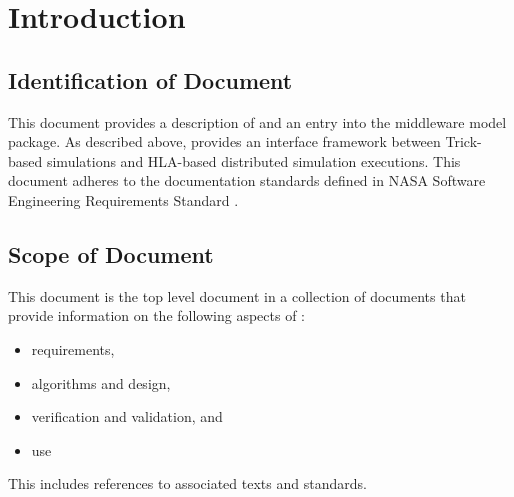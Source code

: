 \documentclass[twoside,11pt,titlepage]{report}
\begin{document}

\date{June 2020}
\modelname{\TrickHLA}
\doctype{}
\author{Edwin Z. Crues \\ and \\ Daniel E. Dexter}
\makeTrickhlaenvTitlepage



\tableofcontents
\vfill

\pagebreak


\chapter{Introduction}


\section{Identification of Document}
This document provides a description of and an entry into the \TrickHLA
middleware model package. As described above, \TrickHLA provides an interface
framework between Trick-based simulations and HLA-based distributed simulation
executions. This document adheres to the documentation standards defined in
NASA Software Engineering Requirements Standard \cite{NASA:SWE}.

\section{Scope of Document}
This document is the top level document in a collection of documents that
provide information on the following aspects of \TrickHLA :
\begin{itemize}
\item requirements,
\item algorithms and design,
\item verification and validation, and
\item use
\end{itemize}
This includes references to associated texts and standards.
\end{document}
